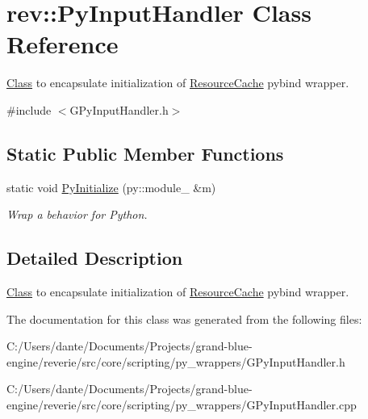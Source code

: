 \hypertarget{classrev_1_1_py_input_handler}{}\section{rev\+::Py\+Input\+Handler Class Reference}
\label{classrev_1_1_py_input_handler}


\mbox{\hyperlink{struct_class}{Class}} to encapsulate initialization of \mbox{\hyperlink{classrev_1_1_resource_cache}{Resource\+Cache}} pybind wrapper.  




{\ttfamily \#include $<$G\+Py\+Input\+Handler.\+h$>$}

\subsection*{Static Public Member Functions}
\begin{DoxyCompactItemize}
\item 
\mbox{\label{classrev_1_1_py_input_handler_ac23d8b3179fc49f18964ed999724b9d2}} 
static void \mbox{\hyperlink{classrev_1_1_py_input_handler_ac23d8b3179fc49f18964ed999724b9d2}{Py\+Initialize}} (py\+::module\+\_\+ \&m)
\begin{DoxyCompactList}\small\item\em Wrap a behavior for Python. \end{DoxyCompactList}\end{DoxyCompactItemize}


\subsection{Detailed Description}
\mbox{\hyperlink{struct_class}{Class}} to encapsulate initialization of \mbox{\hyperlink{classrev_1_1_resource_cache}{Resource\+Cache}} pybind wrapper. 

The documentation for this class was generated from the following files\+:\begin{DoxyCompactItemize}
\item 
C\+:/\+Users/dante/\+Documents/\+Projects/grand-\/blue-\/engine/reverie/src/core/scripting/py\+\_\+wrappers/G\+Py\+Input\+Handler.\+h\item 
C\+:/\+Users/dante/\+Documents/\+Projects/grand-\/blue-\/engine/reverie/src/core/scripting/py\+\_\+wrappers/G\+Py\+Input\+Handler.\+cpp\end{DoxyCompactItemize}
